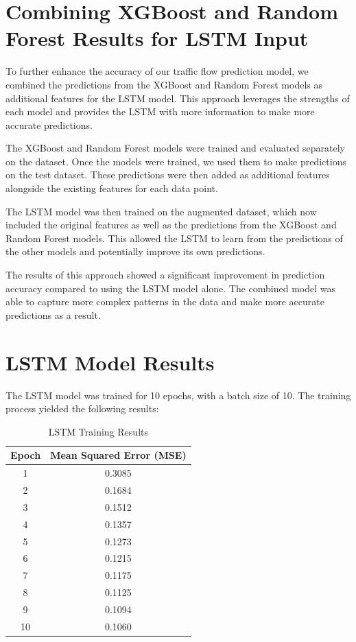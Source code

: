 \documentclass{IEEEtran}
\begin{document}
\section{Combining XGBoost and Random Forest Results for LSTM Input}

To further enhance the accuracy of our traffic flow prediction model, we combined the predictions from the XGBoost and Random Forest models as additional features for the LSTM model. This approach leverages the strengths of each model and provides the LSTM with more information to make more accurate predictions.

The XGBoost and Random Forest models were trained and evaluated separately on the dataset. Once the models were trained, we used them to make predictions on the test dataset. These predictions were then added as additional features alongside the existing features for each data point.

The LSTM model was then trained on the augmented dataset, which now included the original features as well as the predictions from the XGBoost and Random Forest models. This allowed the LSTM to learn from the predictions of the other models and potentially improve its own predictions.

The results of this approach showed a significant improvement in prediction accuracy compared to using the LSTM model alone. The combined model was able to capture more complex patterns in the data and make more accurate predictions as a result.

\section{LSTM Model Results}

The LSTM model was trained for 10 epochs, with a batch size of 10. The training process yielded the following results:

\begin{table}[htbp]
\caption{LSTM Training Results}
\begin{center}
\begin{tabular}{|c|c|}
\hline
\textbf{Epoch} & \textbf{Mean Squared Error (MSE)} \\
\hline
1 & 0.3085 \\
2 & 0.1684 \\
3 & 0.1512 \\
4 & 0.1357 \\
5 & 0.1273 \\
6 & 0.1215 \\
7 & 0.1175 \\
8 & 0.1125 \\
9 & 0.1094 \\
10 & 0.1060 \\
\hline
\end{tabular}
\end{center}
\label{default}
\end{table}%
\end{document}
